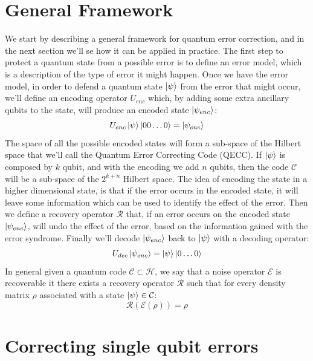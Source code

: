 \documentclass{article}
\begin{document}
	\section{General Framework}
	We start by describing a general framework for quantum error correction, and in the next section we'll se how it can be applied in practice. The first step to protect a quantum state from a possible error is to define an error model, which is a description of the type of error it might happen. Once we have the error model, in order to defend a quantum state $\ket{\psi}$ from the error that might occur, we'll define an encoding operator $U_{enc}$ which, by adding some extra ancillary qubits to the state, will produce an encoded state $\ket{\psi_{enc}}$:
	\[ U_{enc}\ket{\psi}\ket{00\dots0} = \ket{\psi_{enc}} \]
	The space of all the possible encoded states will form a sub-space of the Hilbert space that we'll call the Quantum Error Correcting Code (QECC). If $\ket{\psi}$ is composed by $k$ qubit, and with the encoding we add $n$ qubits, then the code $\mathcal{C}$ will be a sub-space of the $2^{k+n}$ Hilbert space. The idea of encoding the state in a higher dimensional state, is that if the error occurs in the encoded state, it will leave some information which can be used to identify the effect of the error. Then we define a recovery operator $\mathcal{R}$ that, if an error occurs on the encoded state $\ket{\psi_{enc}}$, will undo the effect of the error, based on the information gained with the error syndrome. Finally we'll decode $\ket{\psi_{enc}}$ back to $\ket{\psi}$ with a decoding operator:
	\[U_{dec}\ket{\psi_{enc}} = \ket{\psi}\ket{0\dots0}\]
	In general given a quantum code $\mathcal{C} \subset \mathcal{H}$, we say that a noise operator $\mathcal{E}$ is recoverable it there exists a recovery operator $\mathcal{R}$ such that for every density matrix $\rho$ associated with a state $\ket{\psi} \in \mathcal{C}$:
	\[ \mathcal{R(\mathcal{E}(\rho))} = \rho\]
		
	\section{Correcting single qubit errors}
\end{document}
